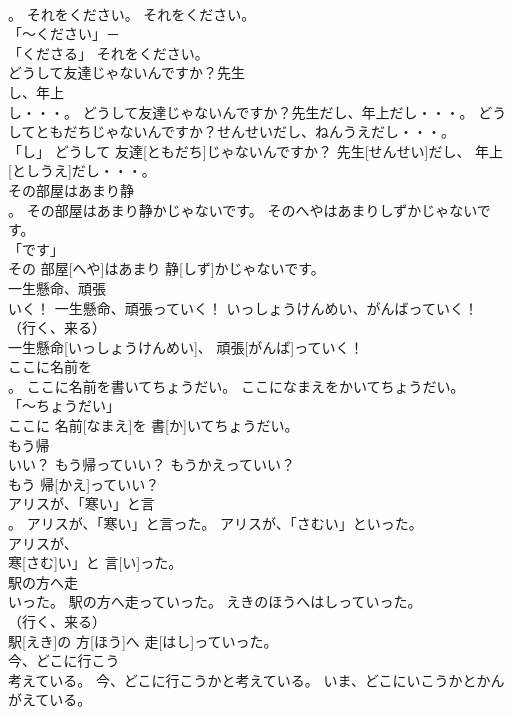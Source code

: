 \documentclass[8pt]{extreport}
\begin{document}
\begin{CJK}{UTF8}{min}
\\	。	それをください。	それをください。	
\\	「～ください」－ 
\\	「くださる」	それをください。		
\\	どうして友達じゃないんですか？先生
\\	し、年上
\\	し・・・。	どうして友達じゃないんですか？先生だし、年上だし・・・。	どうしてともだちじゃないんですか？せんせいだし、ねんうえだし・・・。	
\\	「し」	どうして 友達[ともだち]じゃないんですか？ 先生[せんせい]だし、 年上[としうえ]だし・・・。		
\\	その部屋はあまり静
\\	。	その部屋はあまり静かじゃないです。	そのへやはあまりしずかじゃないです。	
\\	「です」 
\\	その 部屋[へや]はあまり 静[しず]かじゃないです。		
\\	一生懸命、頑張
\\	いく！	一生懸命、頑張っていく！	いっしょうけんめい、がんばっていく！	
\\	（行く、来る） 
\\	一生懸命[いっしょうけんめい]、 頑張[がんば]っていく！		
\\	ここに名前を
\\	。	ここに名前を書いてちょうだい。	ここになまえをかいてちょうだい。	
\\	「～ちょうだい」 
\\	ここに 名前[なまえ]を 書[か]いてちょうだい。		
\\	もう帰
\\	いい？	もう帰っていい？	もうかえっていい？	
\\	もう 帰[かえ]っていい？		
\\	アリスが、「寒い」と言
\\	。	アリスが、「寒い」と言った。	アリスが、「さむい」といった。	
\\	アリスが、
\\	寒[さむ]い」と 言[い]った。		
\\	駅の方へ走
\\	いった。	駅の方へ走っていった。	えきのほうへはしっていった。	
\\	（行く、来る） 
\\	駅[えき]の 方[ほう]へ 走[はし]っていった。		
\\	今、どこに行こう
\\	考えている。	今、どこに行こうかと考えている。	いま、どこにいこうかとかんがえている。	

\end{CJK}
\end{document}
